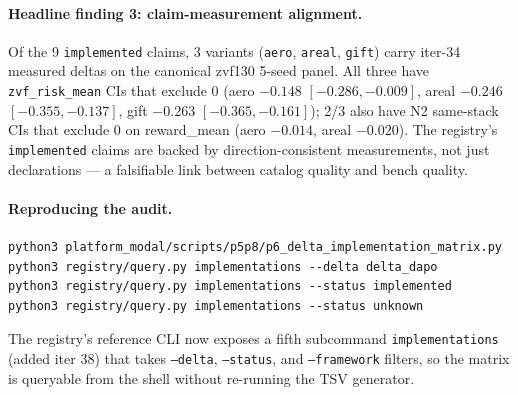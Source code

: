 \paragraph{Headline finding 3: claim-measurement alignment.}
Of the 9 \texttt{implemented} claims, 3 variants
(\texttt{aero}, \texttt{areal}, \texttt{gift}) carry iter-34 measured
deltas on the canonical zvf130 5-seed panel. All three have
\texttt{zvf\_risk\_mean} CIs that exclude 0 (aero $-0.148$
$[-0.286, -0.009]$, areal $-0.246$ $[-0.355, -0.137]$, gift $-0.263$
$[-0.365, -0.161]$); 2/3 also have N2 same-stack CIs that exclude 0
on reward\_mean (aero $-0.014$, areal $-0.020$). The registry's
\texttt{implemented} claims are backed by direction-consistent
measurements, not just declarations --- a falsifiable link between
catalog quality and bench quality.

\paragraph{Reproducing the audit.}
\begin{verbatim}
python3 platform_modal/scripts/p5p8/p6_delta_implementation_matrix.py
python3 registry/query.py implementations --delta delta_dapo
python3 registry/query.py implementations --status implemented
python3 registry/query.py implementations --status unknown
\end{verbatim}
The registry's reference CLI now exposes a fifth subcommand
\texttt{implementations} (added iter 38) that takes
\texttt{--delta}, \texttt{--status}, and \texttt{--framework} filters,
so the matrix is queryable from the shell without re-running the TSV
generator.

